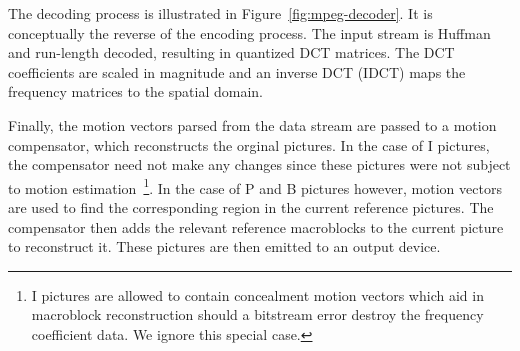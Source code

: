 The decoding process is illustrated in
Figure~\ref{fig:mpeg-decoder}. It is conceptually the reverse of the
encoding process. The input stream is Huffman and run-length decoded,
resulting in quantized DCT matrices. The DCT coefficients are scaled
in magnitude and an inverse DCT (IDCT) maps the frequency matrices to
the spatial domain.

Finally, the motion vectors parsed from the data stream are passed to
a motion compensator, which reconstructs the orginal pictures. In the
case of I pictures, the compensator need not make any changes since
these pictures were not subject to motion estimation~\footnote{I 
pictures are allowed to contain concealment motion vectors which aid in
macroblock reconstruction should a bitstream error destroy the 
frequency coefficient data. We ignore this special case.}. In the case of P
and B pictures however, motion vectors are used to find the
corresponding region in the current reference pictures. The
compensator then adds the relevant reference macroblocks to the
current picture to reconstruct it. These pictures are then emitted to
an output device.